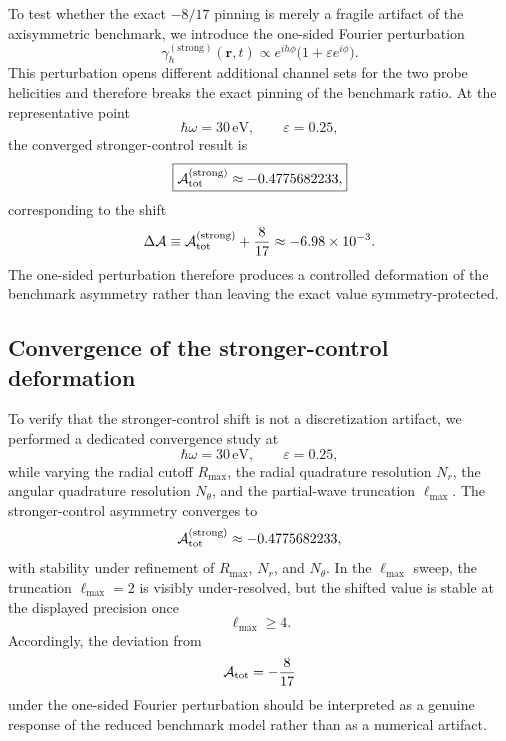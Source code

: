 \documentclass[11pt,a4paper]{article}
\begin{document}
    To test whether the exact \(-8/17\) pinning is merely a fragile artifact of the axisymmetric benchmark, we introduce the one-sided Fourier perturbation
    \begin{equation}
        \gamma_h^{(\mathrm{strong})}(\mathbf r,t)
        \propto
        e^{i h\phi}\bigl(1+\varepsilon e^{i\phi}\bigr).
    \end{equation}
    This perturbation opens different additional channel sets for the two probe helicities and therefore breaks the exact pinning of the benchmark ratio. At the representative point
    \begin{equation}
        \hbar\omega = 30\,\mathrm{eV},
        \qquad
        \varepsilon = 0.25,
    \end{equation}
    the converged stronger-control result is
    \begin{equation}
        \boxed{
        \mathcal A_{\rm tot}^{(\mathrm{strong})}
        \approx
        -0.4775682233,
        }
    \end{equation}
    corresponding to the shift
    \begin{equation}
        \Delta \mathcal A
        \equiv
        \mathcal A_{\rm tot}^{(\mathrm{strong})}
        +\frac{8}{17}
        \approx
        -6.98\times 10^{-3}.
    \end{equation}
    The one-sided perturbation therefore produces a controlled deformation of the benchmark asymmetry rather than leaving the exact value symmetry-protected.

    \subsection{Convergence of the stronger-control deformation}

    To verify that the stronger-control shift is not a discretization artifact, we performed a dedicated convergence study at
    \begin{equation}
        \hbar\omega = 30\,\mathrm{eV},
        \qquad
        \varepsilon = 0.25,
    \end{equation}
    while varying the radial cutoff \(R_{\max}\), the radial quadrature resolution \(N_r\), the angular quadrature resolution \(N_\theta\), and the partial-wave truncation \(\ell_{\max}\). The stronger-control asymmetry converges to
    \begin{equation}
        \mathcal A_{\rm tot}^{(\mathrm{strong})}
        \approx
        -0.4775682233,
    \end{equation}
    with stability under refinement of \(R_{\max}\), \(N_r\), and \(N_\theta\). In the \(\ell_{\max}\) sweep, the truncation \(\ell_{\max}=2\) is visibly under-resolved, but the shifted value is stable at the displayed precision once
    \begin{equation}
        \ell_{\max}\ge 4.
    \end{equation}
    Accordingly, the deviation from
    \begin{equation}
        \mathcal A_{\rm tot}=-\frac{8}{17}
    \end{equation}
    under the one-sided Fourier perturbation should be interpreted as a genuine response of the reduced benchmark model rather than as a numerical artifact.
\end{document}
